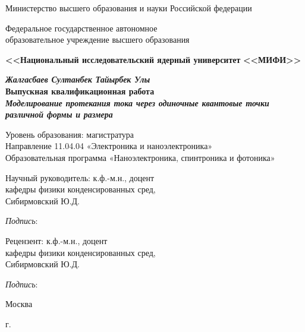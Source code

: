 \begin{titlepage}
\begin{center}
Министерство высшего образования и науки Российской федерации

Федеральное государственное автономное \\образовательное учреждение высшего образования

\textbf{<<Национальный исследовательский ядерный университет}
\textbf{<<МИФИ>>}

\vspace{25mm}

\textbf{\textit{\large Жалгасбаев Султанбек Тайырбек Улы}} \\[8mm]
\textbf{\large Выпускная квалификационная работа}\\[3mm]
\textbf{\textit{\large Моделирование протекания тока через одиночные квантовые точки различной формы и размера}}

\vspace{15mm}
Уровень образования: магистратура\\
Направление 11.04.04 «Электроника и наноэлектроника»\\
Образовательная программа
«Наноэлектроника, спинтроника и фотоника»

\vspace{10mm}

\begin{flushright}
\begin{minipage}[t]{0.7\textwidth}
{Научный руководитель:} к.ф.-м.н., доцент\\
кафедры физики конденсированных сред, \\Сибирмовский Ю.Д. 

\vspace{5mm}

\textit{Подпись}: \hrulefill

\vspace{10mm}

{Рецензент:} к.ф.-м.н., доцент\\
кафедры физики конденсированных сред, \\Сибирмовский Ю.Д. 

\vspace{5mm}

\textit{Подпись}: \hrulefill

\end{minipage}
\end{flushright}

\vfill 

{Москва}
\par{\the\year{} г.}
\end{center}
\end{titlepage}
\restoregeometry
\addtocounter{page}{1}
